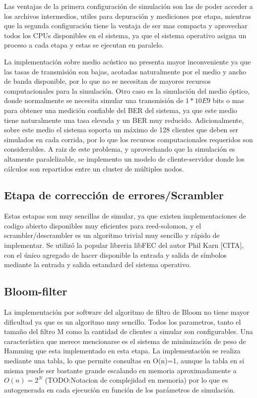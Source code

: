 Las ventajas de la primera configuración de simulación son las de poder acceder a los archivos intermedios, utiles para depuración y mediciones por etapa, mientras que la segunda configuración tiene la ventaja de ser mas compacta y aprovechar todos los CPUs disponibles en el sistema, ya que el sistema operativo asigna un proceso a cada etapa y estas se ejecutan en paralelo.

La implementación sobre medio acústico no presenta mayor inconveniente ya que las tasas de transmisión son bajas, acotadas naturalmente por el medio y ancho de banda disponible, por lo 
que no se necesitan de mayores recursos computacionales para la simulación. Otro caso es la simulación del medio óptico, donde normalmente se necesita simular una transmisión de $1*10E9$ bits o mas para obtener una medición confiable del BER del sistema, ya que este medio tiene naturalmente una tasa elevada y un BER muy reducido. Adicionalmente, sobre este medio el sistema soporta un máximo de 128 clientes que deben ser simulados en cada corrida, por lo que los recursos computacionales requeridos son considerables. A raiz de este problema, y aprovechando que la simulación es altamente paralelizable, se implemento un modelo de cliente-servidor donde los cálculos son repartidos entre un cluster de múltiples nodos.

\subsection{Etapa de corrección de errores/Scrambler}
Estas estapas son muy sencillas de simular, ya que existen implementaciones de codigo abierto disponibles muy eficientes para reed-solomon, y el scrambler/descrambler es un algoritmo trivial muy sencillo y rápido de implementar. Se utilizó la popular libreria libFEC del autor Phil Karn [CITA], con el único agregado de hacer disponible la entrada y salida de símbolos mediante la entrada y salida estandard del sistema operativo.

\subsection{Bloom-filter}
La implementación por software del algoritmo de filtro de Bloom no tiene mayor dificultad ya que es un algoritmo muy sencillo. Todos los parametros, tanto el tamaño del filtro M como la cantidad de clientes a simular son configurables. Una característica que merece mencionarse es el sistema de minimización de peso de Hamming que esta implementado en esta etapa. La implementación se realiza mediante una tabla, lo que permite consultas en O(n)=1, aunque la tabla en si misma puede ser bastante grande escalando en memoria aproximadamente a $O(n)=2^{N}$ (TODO:Notacion de complejidad en memoria) por lo que es autogenerada en cada ejecución en función de los parámetros de simulación.

